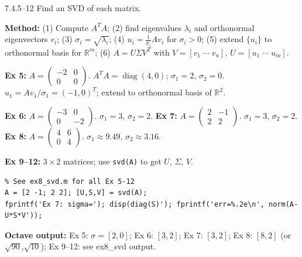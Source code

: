 \begin{exercise}{7.4.5--12}
Find an SVD of each matrix.
\end{exercise}
\begin{solution}
\textbf{Method:} (1) Compute $A^TA$; (2) find eigenvalues $\lambda_i$ and orthonormal eigenvectors $v_i$; (3) $\sigma_i=\sqrt{\lambda_i}$; (4) $u_i=\frac{1}{\sigma_i}Av_i$ for $\sigma_i>0$; (5) extend $\{u_i\}$ to orthonormal basis for $\mathbb{R}^m$; (6) $A=U\Sigma V^T$ with $V=[v_1\;\cdots\;v_n]$, $U=[u_1\;\cdots\;u_m]$.

\textbf{Ex 5:} $A=\begin{pmatrix}-2&0\\0&0\end{pmatrix}$. $A^TA=\operatorname{diag}(4,0)$; $\sigma_1=2$, $\sigma_2=0$. $u_1=Av_1/\sigma_1=(-1,0)^T$; extend to orthonormal basis of $\mathbb{R}^2$.

\textbf{Ex 6:} $A=\begin{pmatrix}-3&0\\0&-2\end{pmatrix}$. $\sigma_1=3$, $\sigma_2=2$. \textbf{Ex 7:} $A=\begin{pmatrix}2&-1\\2&2\end{pmatrix}$. $\sigma_1=3$, $\sigma_2=2$. \textbf{Ex 8:} $A=\begin{pmatrix}4&6\\0&4\end{pmatrix}$. $\sigma_1\approx9.49$, $\sigma_2\approx3.16$.

\textbf{Ex 9--12:} $3\times2$ matrices; use \texttt{svd(A)} to get $U$, $\Sigma$, $V$.
\begin{lstlisting}
% See ex8_svd.m for all Ex 5-12
A = [2 -1; 2 2]; [U,S,V] = svd(A);
fprintf('Ex 7: sigma='); disp(diag(S)'); fprintf('err=%.2e\n', norm(A-U*S*V'));
\end{lstlisting}
\textbf{Octave output:} Ex 5: $\sigma=[2,0]$; Ex 6: $[3,2]$; Ex 7: $[3,2]$; Ex 8: $[8,2]$ (or $\sqrt{90}$,$\sqrt{10}$); Ex 9--12: see ex8\_svd output.
\end{solution}

